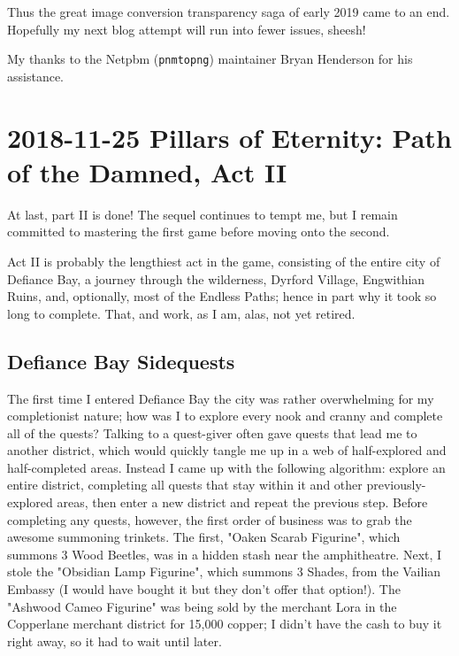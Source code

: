 \documentclass{article}
\begin{document}
Thus the great image conversion transparency saga of early 2019 came to an end.  Hopefully my next blog attempt will run into fewer issues, sheesh!

My thanks to the Netpbm (\texttt{pnmtopng}) maintainer Bryan Henderson for his assistance.


\section{2018-11-25 Pillars of Eternity: Path of the Damned, Act II}
At last, part II is done!  The sequel continues to tempt me, but I remain committed to mastering the first game before moving onto the second.

Act II is probably the lengthiest act in the game, consisting of the entire city of Defiance Bay, a journey through the wilderness, Dyrford Village, Engwithian Ruins, and, optionally, most of the Endless Paths; hence in part why it took so long to complete.  That, and work, as I am, alas, not yet retired.

\subsection{Defiance Bay Sidequests}
The first time I entered Defiance Bay the city was rather overwhelming for my completionist nature; how was I to explore every nook and cranny and complete all of the quests?  Talking to a quest-giver often gave quests that lead me to another district, which would quickly tangle me up in a web of half-explored and half-completed areas.  Instead I came up with the following algorithm: explore an entire district, completing all quests that stay within it and other previously-explored areas, then enter a new district and repeat the previous step.  Before completing any quests, however, the first order of business was to grab the awesome summoning trinkets.  The first, "Oaken Scarab Figurine", which summons 3 Wood Beetles, was in a hidden stash near the amphitheatre.  Next, I stole the "Obsidian Lamp Figurine", which summons 3 Shades, from the Vailian Embassy (I would have bought it but they don't offer that option!).  The "Ashwood Cameo Figurine" was being sold by the merchant Lora in the Copperlane merchant district for 15,000 copper; I didn't have the cash to buy it right away, so it had to wait until later.
\end{document}
